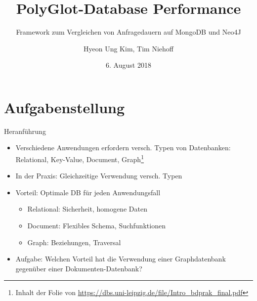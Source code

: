 \documentclass[12pt,usenames,dvipsnames]{beamer}
\title{PolyGlot-Database Performance}
\subtitle{Framework zum Vergleichen von Anfragedauern auf MongoDB und Neo4J}
\author{Hyeon Ung Kim, Tim Niehoff}
\date{6. August 2018}
\begin{document}
	\maketitle
			
	\section{Aufgabenstellung}
	\begin{frame}{Heranführung}
	\begin{itemize}[<+- | alert@+>]
	\item Verschiedene Anwendungen erfordern versch. Typen
von Datenbanken: Relational, Key-Value, Document, Graph\footnote{ Inhalt der Folie von \url{https://dbs.uni-leipzig.de/file/Intro_bdprak_final.pdf}}
	\item In der Praxis: Gleichzeitige Verwendung versch. Typen
	\item Vorteil: Optimale DB für jeden Anwendungsfall
	\begin{itemize} [<+- | alert@+>]
	\item Relational: Sicherheit, homogene Daten
	\item Document: Flexibles Schema, Suchfunktionen
	\item Graph: Beziehungen, Traversal
	\end{itemize}
	\item Aufgabe: Welchen Vorteil hat die Verwendung einer
Graphdatenbank gegenüber einer Dokumenten-Datenbank?
	\end{itemize}	
	\end{frame}
\end{document}

